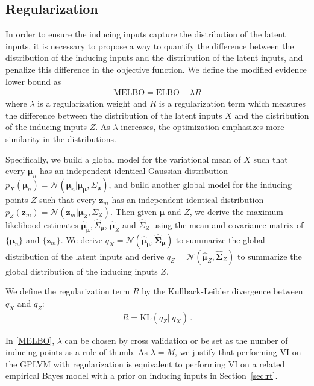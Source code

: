 \documentclass{article}
\begin{document}
\subsection{Regularization} \label{sec:r}
In order to ensure the inducing inputs capture the distribution of the latent inputs, it is necessary to propose a way to quantify the difference between the distribution of the inducing inputs and the distribution of the latent inputs, and penalize this difference in the objective function. We define the modified evidence lower bound as
\begin{eqnarray}
\mathrm{MELBO} = \mathrm{ELBO} - \lambda R
\label{MELBO}
\end{eqnarray} 
where $\lambda$ is a regularization weight and $R$ is a regularization term which measures the difference between the distribution of the latent inputs $X$ and the distribution of the inducing inputs $Z$. As $\lambda$ increases, the optimization emphasizes more similarity in the distributions.

Specifically, we build a global model for the variational mean of $X$ such that every $\bm \mu_n$ has an independent identical Gaussian distribution $p_X(\bm \mu_n) = \mathcal{N}(\bm \mu_n| \bm \mu_{\bm \mu}, \Sigma_{\bm \mu})$, and build another global model for the inducing points $Z$ such that every $\bm z_m$ has an independent identical distribution $p_Z(\bm z_m) = \mathcal{N}(\bm z_m| \bm \mu_Z, \Sigma_Z)$. Then given $\bm \mu$ and $Z$, we derive the maximum likelihood estimates $\hat{\bm\mu}_{\bm \mu}, \hat{\Sigma}_{\bm \mu}$, $\hat{\bm \mu}_Z$ and $\hat{\Sigma}_Z$ using the mean and covariance matrix of $\{\bm \mu_n\}$ and $\{\bm z_m\}$. We derive $q_X = \mathcal{N}(\hat{\bm\mu}_{\bm\mu}, \hat{\bm\Sigma}_{\bm \mu})$ to summarize the global distribution of the latent inputs and derive
$q_Z = \mathcal{N}(\hat{\bm\mu}_Z, \hat{\bm\Sigma}_Z)$ to summarize the global distribution of the inducing inputs $Z$.

We define the regularization term $R$ by the Kullback-Leibler divergence between $q_X$ and $q_Z$:
\begin{eqnarray}
R = \mathrm{KL}(q_Z||q_X)\,.
\end{eqnarray}

In \ref{MELBO}, $\lambda$ can be chosen by cross validation or be set as the number of inducing points as a rule of thumb. As $\lambda = M$, we justify that performing VI on the GPLVM with regularization is equivalent to performing VI on a related empirical Bayes model with a prior on inducing inputs in Section~\ref{sec:rt}.
\end{document}
